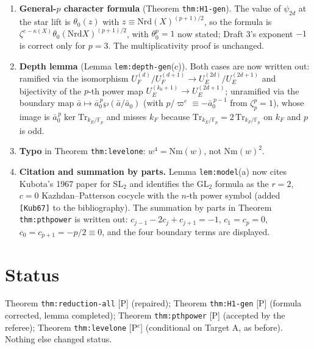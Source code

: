 \documentclass[11pt]{article}
\newcommand{\F}{\mathbb F}
\begin{document}
\begin{enumerate}[leftmargin=*]
\texttt{thm:reduction} is unaffected.
\item \textbf{General-$p$ character formula} (Theorem \texttt{thm:H1-gen}).
The value of $\psi_{2d}$ at the star lift is $\theta_0(z)$ with
$z\equiv\mathrm{Nrd}(X)^{(p+1)/2}$, so the formula is
$\zeta^{e-\kappa(X)}\theta_0(\mathrm{Nrd}X)^{(p+1)/2}$, with $\theta_0^p=1$
now stated; Draft 3's exponent $-1$ is correct only for $p=3$.  The
multiplicativity proof is unchanged.
\item \textbf{Depth lemma} (Lemma \texttt{lem:depth-gen}(c)).  Both cases
are now written out: ramified via the isomorphism
$U_F^{(d)}/U_F^{(d+1)}\to U_E^{(2d)}/U_E^{(2d+1)}$ and bijectivity of the
$p$-th power map $U_E^{(k_0+1)}\to U_E^{(2d+1)}$; unramified via the
boundary map $\bar a\mapsto\bar a_0^{\,p}\wp(\bar a/\bar a_0)$ (with
$p/\varpi^e\equiv-\bar a_0^{\,p-1}$ from $\zeta_p^p=1$), whose image is
$\bar a_0^{\,p}\ker\mathrm{Tr}_{k_E/\F_p}$ and misses $k_F$ because
$\mathrm{Tr}_{k_E/\F_p}=2\,\mathrm{Tr}_{k_F/\F_p}$ on $k_F$ and $p$ is odd.
\item \textbf{Typo} in Theorem \texttt{thm:levelone}: $w^4=\mathrm{Nm}(w)$,
not $\mathrm{Nm}(w)^2$.
\item \textbf{Citation and summation by parts.}  Lemma \texttt{lem:model}(a)
now cites Kubota's 1967 paper for $\mathrm{SL}_2$ and identifies the
$\mathrm{GL}_2$ formula as the $r=2$, $c=0$ Kazhdan--Patterson cocycle
with the $n$-th power symbol (added \texttt{[Kub67]} to the
bibliography).  The summation by parts in Theorem \texttt{thm:pthpower}
is written out: $c_{j-1}-2c_j+c_{j+1}=-1$, $c_1=c_p=0$,
$c_0=c_{p+1}=-p/2\equiv0$, and the four boundary terms are displayed.
\end{enumerate}
\section*{Status}
Theorem \texttt{thm:reduction-all} [P] (repaired); Theorem
\texttt{thm:H1-gen} [P] (formula corrected, lemma completed);
Theorem \texttt{thm:pthpower} [P] (accepted by the referee); Theorem
\texttt{thm:levelone} [P$^c$] (conditional on Target A, as before).
Nothing else changed status.
\end{document}
